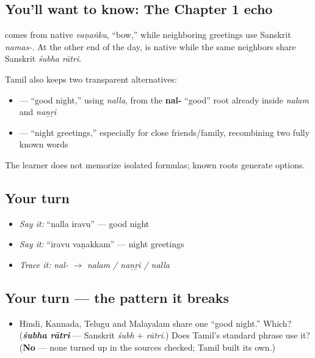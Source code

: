 \subsection*{You'll want to know: The Chapter 1 echo}
\textbf{} comes from native \emph{vaṇaṅku}, \textquotedblleft{}bow,\textquotedblright{} while neighboring greetings use Sanskrit \emph{namas-}. At the other end of the day, \textbf{ } is native while the same neighbors share Sanskrit \emph{śubha rātri}.

Tamil also keeps two transparent alternatives:

\begin{itemize}
\raggedright
  \item \textbf{ } — \textquotedblleft{}good night,\textquotedblright{} using \emph{nalla}, from the \textbf{nal-} \textquotedblleft{}good\textquotedblright{} root already inside \emph{nalam} and \emph{naṉṟi}
  \item \textbf{ } — \textquotedblleft{}night greetings,\textquotedblright{} especially for close friends/family, recombining two fully known words
\end{itemize}

The learner does not memorize isolated formulas; known roots generate options.

\subsection*{Your turn}
\begin{itemize}
\raggedright
  \item \emph{Say it:} \textquotedblleft{}nalla iravu\textquotedblright{} — good night
  \item \emph{Say it:} \textquotedblleft{}iravu vaṇakkam\textquotedblright{} — night greetings
  \item \emph{Trace it:} \emph{nal-} $\to$ \emph{nalam / naṉṟi / nalla}
\end{itemize}

\subsection*{Your turn — the pattern it breaks}
\begin{itemize}
\raggedright
  \item Hindi, Kannada, Telugu and Malayalam share one \textquotedblleft{}good night.\textquotedblright{} Which? (\emph{\textbf{śubha rātri}} — Sanskrit \emph{śubh} + \emph{rātri}.) Does Tamil's standard phrase use it? (\textbf{No} — none turned up in the sources checked; Tamil built its own.)
\end{itemize}

